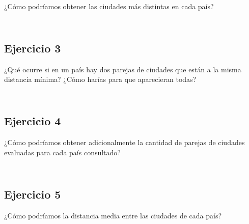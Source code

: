 ¿Cómo podríamos obtener las ciudades más distintas en cada país?

\begin{lstlisting}

\end{lstlisting}

\begin{lstlisting}

\end{lstlisting}

\subsection{Ejercicio 3}

¿Qué ocurre si en un país hay dos parejas de ciudades que están a la misma distancia mínima? ¿Cómo harías para que aparecieran todas?

\begin{lstlisting}

\end{lstlisting}

\begin{lstlisting}

\end{lstlisting}

\subsection{Ejercicio 4}

¿Cómo podríamos obtener adicionalmente la cantidad de parejas de ciudades evaluadas para cada país consultado?

\begin{lstlisting}

\end{lstlisting}

\begin{lstlisting}

\end{lstlisting}

\subsection{Ejercicio 5}

¿Cómo podríamos la distancia media entre las ciudades de cada país?

\begin{lstlisting}

\end{lstlisting}

